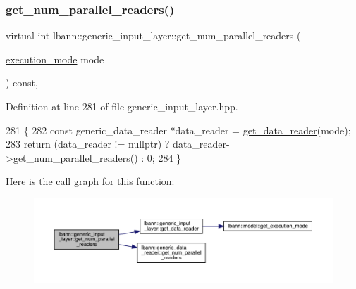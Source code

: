 \subsubsection{\texorpdfstring{get\+\_\+num\+\_\+parallel\+\_\+readers()}{get\_num\_parallel\_readers()}\hspace{0.1cm}{\footnotesize\ttfamily [1/2]}}
{\footnotesize\ttfamily virtual int lbann\+::generic\+\_\+input\+\_\+layer\+::get\+\_\+num\+\_\+parallel\+\_\+readers (\begin{DoxyParamCaption}\item[{\hyperlink{base_8hpp_a2781a159088df64ed7d47cc91c4dc0a8}{execution\+\_\+mode}}]{mode }\end{DoxyParamCaption}) const\hspace{0.3cm}{\ttfamily [inline]}, {\ttfamily [virtual]}}



Definition at line 281 of file generic\+\_\+input\+\_\+layer.\+hpp.


\begin{DoxyCode}
281                                                                   \{
282     \textcolor{keyword}{const} generic\_data\_reader *data\_reader = \hyperlink{classlbann_1_1generic__input__layer_aba732becdb02627e3ad4493ac19e8fb6}{get\_data\_reader}(mode);
283     \textcolor{keywordflow}{return} (data\_reader != \textcolor{keyword}{nullptr}) ? data\_reader->get\_num\_parallel\_readers() : 0;
284   \}
\end{DoxyCode}
Here is the call graph for this function\+:\nopagebreak
\begin{figure}[H]
\begin{center}
\leavevmode
\includegraphics[width=350pt]{classlbann_1_1generic__input__layer_a8a85d3e1bdd31082ca22535939596acb_cgraph}
\end{center}
\end{figure}
\mbox{\label{classlbann_1_1generic__input__layer_a5ed2e13553574ba9ff54565ebc049982}} 
